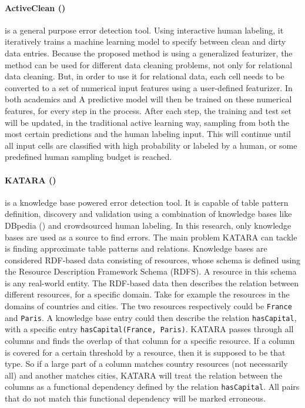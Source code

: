 
\paragraph{ActiveClean (\cite{Krishnan2016-va})} is a general purpose error detection tool. Using interactive human labeling, it iteratively trains a machine learning model to specify between clean and dirty data entries. Because the proposed method is using a generalized featurizer, the method can be used for different data cleaning problems, not only for relational data cleaning. But, in order to use it for relational data, each cell needs to be converted to a set of numerical input features using a user-defined featurizer. In both academics and  A predictive model will then be trained on these numerical features, for every step in the process. After each step, the training and test set will be updated, in the traditional active learning way, sampling from both the most certain predictions and the human labeling input. This will continue until all input cells are classified with high probability or labeled by a human, or some predefined human sampling budget is reached.

\paragraph{KATARA (\cite{Chu2015-fs})} is a knowledge base powered error detection tool. It is capable of table pattern definition, discovery and validation using a combination of knowledge bases like DBpedia (\cite{Auer2007-ie}) and crowdsourced human labeling. In this research, only knowledge bases are used as a source to find errors. The main problem KATARA can tackle is finding approximate table patterns and relations. Knowledge bases are considered RDF-based data consisting of resources, whose schema is defined using the Resource Description Framework Schema (RDFS). A resource in this schema is any real-world entity. The RDF-based data then describes the relation between different resources, for a specific domain. Take for example the resources in the domains of countries and cities. The two resources respectively could be \verb|France| and \verb|Paris|. A knowledge base entry could then describe the relation \verb|hasCapital|, with a specific entry \verb|hasCapital(France, Paris)|. KATARA passes through all columns and finds the overlap of that column for a specific resource. If a column is covered for a certain threshold by a resource, then it is supposed to be that type. So if a large part of a column matches country resources (not necessarily all) and another matches cities, KATARA will treat the relation between the columns as a functional dependency defined by the relation \verb|hasCapital|. All pairs that do not match this functional dependency will be marked erroneous. 

